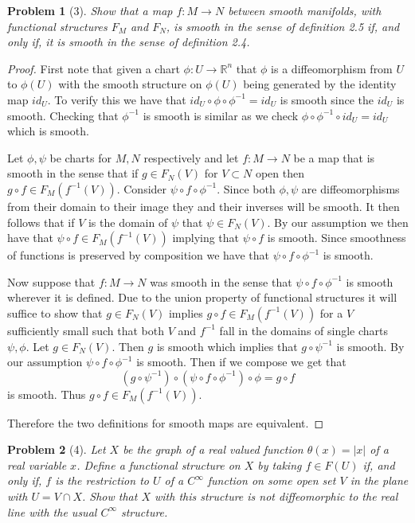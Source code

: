 \documentclass[10pt]{article}
\newcommand{\sk}{\vskip 10mm}
\newcommand{\bb}[1]{\mathbb{#1}}
\theoremstyle{plain}
\newtheorem{problem}{Problem}
\theoremstyle{remark}
\begin{document}
\sk

\begin{problem}[3]
  Show that a map $f:M\rightarrow N$ between smooth manifolds, with functional
  structures $F_M$ and $F_N$, is smooth in the sense of definition 2.5
  if, and only if, it is smooth in the sense of definition 2.4.
\end{problem}

\begin{proof}
  First note that given a chart $\phi:U\rightarrow\bb{R}^n$ that $\phi$ is a diffeomorphism
  from $U$ to $\phi(U)$ with the smooth structure on $\phi(U)$ being generated
  by the identity map $id_U$. To verify this we have that 
  $id_U\circ\phi\circ\phi^{-1}=id_U$ is smooth since the $id_U$ is smooth. Checking that $\phi^{-1}$
  is smooth is similar as we check $\phi\circ\phi^{-1}\circ id_U=id_U$ which is smooth.
  
  Let $\phi,\psi$ be charts for $M,N$ respectively and let $f:M\rightarrow N$ be a map that
  is smooth in the sense that if $g\in F_N(V)$ for $V\subset N$ open then
  $g\circ f\in F_M(f^{-1}(V))$. Consider $\psi\circ f\circ \phi^{-1}$. Since both $\phi,\psi$ are diffeomorphisms
  from their domain to their image they and their inverses will be smooth. It then
  follows that if $V$ is the domain of $\psi$ that $\psi\in F_N(V)$. By
  our assumption we then have that $\psi\circ f\in F_M(f^{-1}(V))$ implying that
  $\psi\circ f$ is smooth. Since smoothness of functions is preserved by composition
  we have that $\psi\circ f\circ\phi^{-1}$ is smooth.

  Now suppose that $f:M\rightarrow N$ was smooth in the sense that $\psi\circ f\circ \phi^{-1}$ is smooth
  wherever it is defined. Due to the union property of functional structures
  it will suffice to show that $g\in F_N(V)$ implies $g\circ f\in F_M(f^{-1}(V))$
  for a $V$ sufficiently small such that both $V$ and $f^{-1}$ fall in the
  domains of single charts $\psi,\phi$. Let $g\in F_N(V)$. Then $g$ is smooth
  which implies that $g\circ\psi^{-1}$ is smooth. By our assumption
  $\psi\circ f\circ \phi^{-1}$ is smooth. Then if we compose we get that
  \[ (g\circ\psi^{-1})\circ(\psi\circ f\circ\phi^{-1})\circ\phi =g\circ f\]
  is smooth. Thus $g\circ f\in F_M(f^{-1}(V))$.

  Therefore the two definitions for smooth maps are equivalent.
\end{proof}

\sk

\begin{problem}[4]
  Let $X$ be the graph of a real valued function $\theta(x)=|x|$ of a real
  variable $x$. Define a functional structure on $X$ by taking $f\in F(U)$
  if, and only if, $f$ is the restriction to $U$ of a $C^\infty$ function on some
  open set $V$ in the plane with $U=V\cap X$. Show that $X$ with this structure
  is \textit{not} diffeomorphic to the real line with the usual $C^\infty$ structure.
\end{problem}
\end{document}
